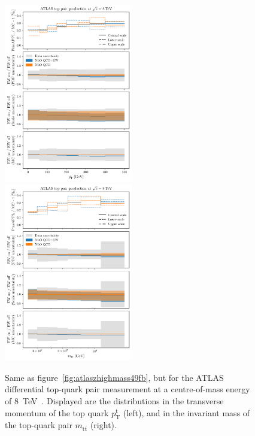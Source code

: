 \begin{figure}[!t]
    \centering
    \includegraphics[width=0.5\textwidth]{figures/pineappl_ATLAS_TTB_DIFF_8TEV_LJ_TPT}%
    \includegraphics[width=0.5\textwidth]{figures/pineappl_ATLAS_TTB_DIFF_8TEV_LJ_TTM}
    \caption{Same as figure~\ref{fig:atlaszhighmass49fb}, but for the ATLAS
      differential top-quark pair measurement at a centre-of-mass energy of
      \SI{8}{\tera\electronvolt}~\cite{Aad:2015mbv}. Displayed are the distributions in the
      transverse momentum of the top quark $p_\mathrm{T}^\mathrm{t}$ (left), and in the invariant
      mass of the top-quark pair $m_{\mathrm{t}\bar{\mathrm{t}}}$ (right).}
    \label{fig:atlastop}
\end{figure}

